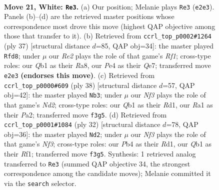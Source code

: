 \documentclass[11pt]{article}
\begin{document}
\clearpage

\begin{figure}[p]\centering
\begin{subfigure}{0.46\textwidth}\centering
\resizebox{\linewidth}{!}{%
\newchessgame
\chessboard[
  setfen={1r1q1b2/n1p1r1pk/p2p1p2/1p1Pp2p/1P2P3/P2P1N1P/3BRPP1/RQ3K2 w - - 0 21},
  showmover=false,
  pgfstyle=straightmove, color=movearrow, markmove={e2-e3}
]}
\caption{}
\end{subfigure}\hfill
\begin{subfigure}{0.46\textwidth}\centering
\resizebox{\linewidth}{!}{%
\newchessgame
\chessboard[
  setfen={r4rk1/1p2qpp1/p1ppb2p/P3p3/1PP5/2QPP1P1/5PBP/R2R2K1 b - - 2 19},
  showmover=false,
  pgfstyle=straightmove, color=movearrow, markmove={f8-d8}
]}
\caption{}
\end{subfigure}
\\[4pt]
\begin{subfigure}{0.46\textwidth}\centering
\resizebox{\linewidth}{!}{%
\newchessgame
\chessboard[
  setfen={r7/1bpnqrpk/pp1p3p/5p2/1PPPp3/2R1P2P/P1QNBPP1/3R2K1 w - - 4 20},
  showmover=false,
  pgfstyle=straightmove, color=movearrow, markmove={d2-b3}
]}
\caption{}
\end{subfigure}\hfill
\begin{subfigure}{0.46\textwidth}\centering
\resizebox{\linewidth}{!}{%
\newchessgame
\chessboard[
  setfen={r3r1k1/1p1nqp1p/2p2bp1/p1p1p3/P3P3/2PPBNPP/1PQ2P2/3R1RK1 w - - 1 17},
  showmover=false,
  pgfstyle=straightmove, color=movearrow, markmove={f3-d2}
]}
\caption{}
\end{subfigure}
\caption{\textbf{Move 21, White: \texttt{Re3}.} (a) Our position; Melanie plays \texttt{Re3} (\texttt{e2e3}). Panels (b)--(d) are the retrieved master positions whose correspondence most drove this move (highest QAP objective among those that transfer to it). (b) Retrieved from \texttt{ccrl\_top\_p0002\#1264} (ply 37) [structural distance $d$=85, QAP obj=34]: the master played \texttt{Rfd8}; under $\mu$ our \emph{Re2} plays the role of that game's \emph{Rf1}; cross-type roles: our \emph{Q}b1 as their \emph{R}a8, our \emph{P}e4 as their \emph{Q}e7; transferred move \texttt{e2e3} \textbf{(endorses this move)}. (c) Retrieved from \texttt{ccrl\_top\_p0000\#609} (ply 38) [structural distance $d$=57, QAP obj=42]: the master played \texttt{Nb3}; under $\mu$ our \emph{Nf3} plays the role of that game's \emph{Nd2}; cross-type roles: our \emph{Q}b1 as their \emph{R}d1, our \emph{R}a1 as their \emph{P}a2; transferred move \texttt{f3g5}. (d) Retrieved from \texttt{ccrl\_top\_p0001\#1084} (ply 32) [structural distance $d$=78, QAP obj=36]: the master played \texttt{Nd2}; under $\mu$ our \emph{Nf3} plays the role of that game's \emph{Nf3}; cross-type roles: our \emph{P}b4 as their \emph{R}d1, our \emph{Q}b1 as their \emph{R}f1; transferred move \texttt{f3g5}. Synthesis: 1 retrieved analog transferred to \texttt{Re3} (summed QAP objective 34, the strongest correspondence among the candidate moves); Melanie committed it via the \texttt{search} selector.}
\label{fig:thought-m40}
\end{figure}
\end{document}
